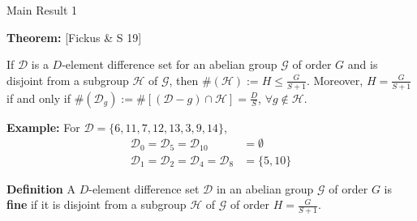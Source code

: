 \documentclass[12pt]{beamer}
\newcommand{\calD}{\mathcal{D}}
\newcommand{\calG}{\mathcal{G}}
\newcommand{\calH}{\mathcal{H}}
\begin{document}
\begin{frame}{Main Result 1}

\textbf{Theorem:} [Fickus \& S 19]\\\smallskip

If $\calD$ is a $D$-element difference set for an abelian group $\calG$ of order $G$ and is disjoint from a subgroup $\calH$ of $\calG$, then $\#(\calH):=H\leq\tfrac{G}{S+1}$. Moreover, $H=\tfrac{G}{S+1}$ if and only if $\#(\calD_g):=\#[(\calD-g)\cap\calH]=\tfrac{D}{S}$, $\forall g\not\in\calH$.

\vfill

\textbf{Example:} For $\calD=\{6,11,7,12,13,3,9,14\}$,
\begin{align*}
    \calD_0=\calD_5=\calD_{10}&=\emptyset\\
    \calD_1=\calD_2=\calD_4=\calD_8&=\{5,10\}
\end{align*}

\textbf{Definition}
A $D$-element difference set $\calD$ in an abelian group $\calG$ of order $G$ is \textbf{fine} if it is disjoint from a subgroup $\calH$ of $\calG$ of order $H=\tfrac{G}{S+1}$.

\end{frame}
\end{document}
